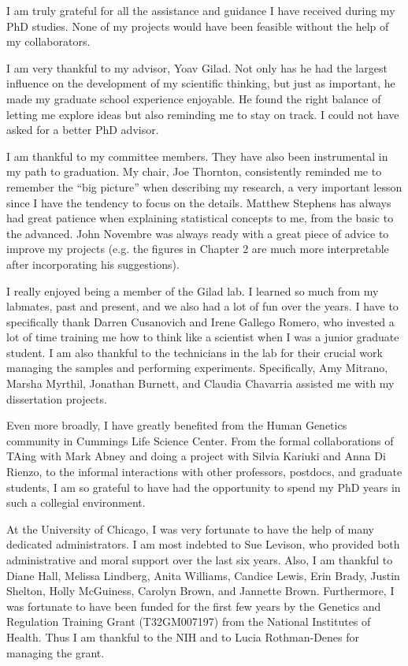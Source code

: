 \acknowledgments

I am truly grateful for all the assistance and guidance I have
received during my PhD studies. None of my projects would have been
feasible without the help of my collaborators.

I am very thankful to my advisor, Yoav Gilad. Not only has he had the
largest influence on the development of my scientific thinking, but
just as important, he made my graduate school experience enjoyable. He
found the right balance of letting me explore ideas but also reminding
me to stay on track. I could not have asked for a better PhD advisor.

I am thankful to my committee members. They have also been
instrumental in my path to graduation. My chair, Joe Thornton,
consistently reminded me to remember the ``big picture'' when
describing my research, a very important lesson since I have the
tendency to focus on the details. Matthew Stephens has always had
great patience when explaining statistical concepts to me, from the
basic to the advanced. John Novembre was always ready with a great
piece of advice to improve my projects (e.g. the figures in Chapter 2
are much more interpretable after incorporating his suggestions).

I really enjoyed being a member of the Gilad lab. I learned so much
from my labmates, past and present, and we also had a lot of fun over
the years. I have to specifically thank Darren Cusanovich and Irene
Gallego Romero, who invested a lot of time training me how to think
like a scientist when I was a junior graduate student. I am also
thankful to the technicians in the lab for their crucial work managing
the samples and performing experiments. Specifically, Amy Mitrano,
Marsha Myrthil, Jonathan Burnett, and Claudia Chavarria assisted me
with my dissertation projects.

Even more broadly, I have greatly benefited from the Human Genetics
community in Cummings Life Science Center. From the formal
collaborations of TAing with Mark Abney and doing a project with
Silvia Kariuki and Anna Di Rienzo, to the informal interactions with
other professors, postdocs, and graduate students, I am so grateful to
have had the opportunity to spend my PhD years in such a collegial
environment.

At the University of Chicago, I was very fortunate to have the help of
many dedicated administrators. I am most indebted to Sue Levison, who
provided both administrative and moral support over the last six
years. Also, I am thankful to Diane Hall, Melissa Lindberg, Anita
Williams, Candice Lewis, Erin Brady, Justin Shelton, Holly McGuiness,
Carolyn Brown, and Jannette Brown. Furthermore, I was fortunate to
have been funded for the first few years by the Genetics and
Regulation Training Grant (T32GM007197) from the National Institutes
of Health. Thus I am thankful to the NIH and to Lucia Rothman-Denes
for managing the grant.


